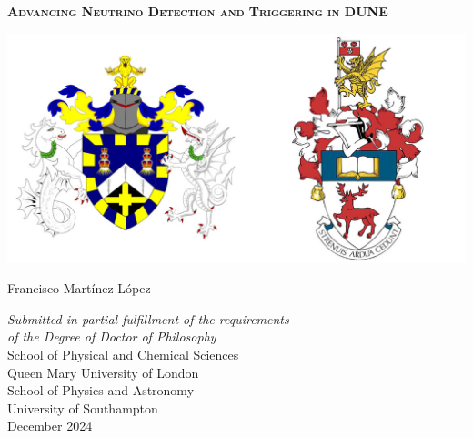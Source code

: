 \begin{titlepage}



\begin{center}

\begin{spacing}{2.5}
{\Huge \textsc{\textbf{Advancing Neutrino Detection and Triggering in DUNE}}}
\end{spacing}

\vspace{1.0 cm}

\begin{center}
\includegraphics[width=1.0\textwidth]{Images/both_crests}
\end{center}
\vspace{0.9cm}


{\LARGE Francisco Mart\'{i}nez L\'{o}pez} %

\vspace{1cm}


{\large \sffamily
\textit{Submitted in partial fulfillment of the
requirements \\ of the Degree of Doctor of Philosophy}\\
\vspace{0.9 cm}
School of Physical and Chemical Sciences\\
Queen Mary University of London\\
\vspace{0.5 cm}
School of Physics and Astronomy\\
University of Southampton\\
\vspace{0.5cm}
December 2024 %
}

\end{center}



\end{titlepage}

\restoregeometry  %
\doublespacing		%
